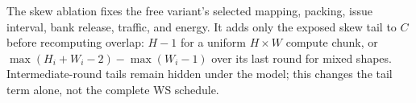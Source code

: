 The skew ablation fixes the free variant's selected mapping, packing,
issue interval, bank release, traffic, and energy. It adds only the
exposed skew tail to $C$ before recomputing overlap: $H-1$ for a
uniform $H{\times}W$ compute chunk, or
$\max(H_i+W_i-2)-\max(W_i-1)$ over its last round for mixed shapes.
Intermediate-round tails remain hidden under the model;
this changes the tail term alone, not the complete WS schedule.

